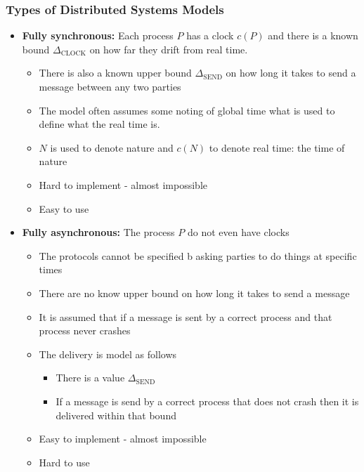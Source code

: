\documentclass[11pt]{article}
\begin{document}
\subsubsection{Types of Distributed Systems Models}
\label{sec:org3c41fcf}
\begin{itemize}
\item \textbf{Fully synchronous:} Each process \(P\) has a clock \(c(P)\) and there is a known bound \(\Delta_\text{CLOCK}\) on how far they drift from real time.
\begin{itemize}
\item There is also a known upper bound \(\Delta_\text{SEND}\) on how long it takes to send a message between any two parties
\item The model often assumes some noting of global time what is used to define what the real time is.
\item \(N\) is used to denote nature and \(c(N)\) to denote real time: the time of nature
\item Hard to implement - almost impossible
\item Easy to use
\end{itemize}

\item \textbf{Fully asynchronous:} The process \(P\) do not even have clocks
\begin{itemize}
\item The protocols cannot be specified b asking parties to do things at specific times
\item There are no know upper bound on how long it takes to send a message
\item It is assumed that if a message is sent by a correct process and that process never crashes
\item The delivery is model as follows
\begin{itemize}
\item There is a value \(\Delta_\text{SEND}\)
\item If a message is send by a correct process that does not crash then it is delivered within that bound
\end{itemize}
\item Easy to implement - almost impossible
\item Hard to use
\end{itemize}


\end{itemize}
\end{document}

